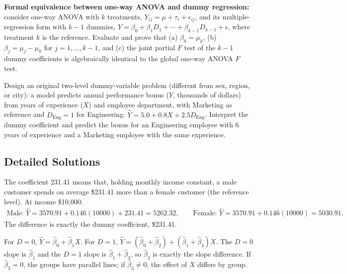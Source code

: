 \begin{problema}
\label{prob:a61b69d}
\textbf{Formal equivalence between one-way ANOVA and dummy regression:} consider one-way ANOVA with $k$ treatments, $Y_{ij}=\mu+\tau_i+\epsilon_{ij}$, and its multiple-regression form with $k-1$ dummies, $Y=\beta_0+\beta_1D_1+\cdots+\beta_{k-1}D_{k-1}+\epsilon$, where treatment $k$ is the reference. Evaluate and prove that (a) $\beta_0=\mu_k$, (b) $\beta_j=\mu_j-\mu_k$ for $j=1,\ldots,k-1$, and (c) the joint partial $F$ test of the $k-1$ dummy coefficients is algebraically identical to the global one-way ANOVA $F$ test.
\end{problema}

\begin{problema}
\label{prob:a9bca82}
Design an original two-level dummy-variable problem (different from sex, region, or city): a model predicts annual performance bonus ($Y$, thousands of dollars) from years of experience ($X$) and employee department, with Marketing as reference and $D_{\text{Eng}}=1$ for Engineering: $\hat Y=5.0+0.8X+2.5D_{\text{Eng}}$. Interpret the dummy coefficient and predict the bonus for an Engineering employee with 6 years of experience and a Marketing employee with the same experience.
\end{problema}

\subsection*{Detailed Solutions}

\begin{solproblema}[prob:9556f7f]
The coefficient 231.41 means that, holding monthly income constant, a male customer spends on average \$231.41 more than a female customer (the reference level). At income \$10,000:
\begin{align}
\text{Male: }\hat Y=3570.91+0.146(10000)+231.41=5262.32,\qquad \text{Female: }\hat Y=3570.91+0.146(10000)=5030.91.
\end{align}
The difference is exactly the dummy coefficient, \$231.41.
\end{solproblema}

\begin{solproblema}[prob:f520b9b]
For $D=0$, $\hat Y=\hat\beta_0+\hat\beta_1X$. For $D=1$, $\hat Y=(\hat\beta_0+\hat\beta_2)+(\hat\beta_1+\hat\beta_3)X$. The $D=0$ slope is $\hat\beta_1$ and the $D=1$ slope is $\hat\beta_1+\hat\beta_3$, so $\hat\beta_3$ is exactly the slope difference. If $\hat\beta_3=0$, the groups have parallel lines; if $\hat\beta_3\ne0$, the effect of $X$ differs by group.
\end{solproblema}

